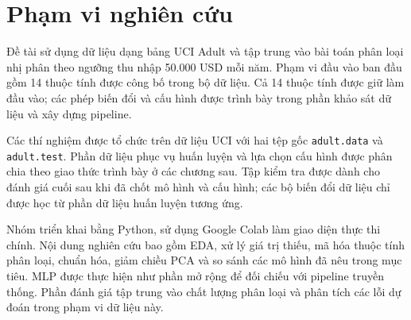 \section{Phạm vi nghiên cứu}
\label{sec:1_3}
Đề tài sử dụng dữ liệu dạng bảng UCI Adult và tập trung vào bài toán phân loại nhị phân theo ngưỡng thu nhập 50.000 USD mỗi năm. Phạm vi đầu vào ban đầu gồm 14 thuộc tính được công bố trong bộ dữ liệu. Cả 14 thuộc tính được giữ làm đầu vào; các phép biến đổi và cấu hình được trình bày trong phần khảo sát dữ liệu và xây dựng pipeline.

Các thí nghiệm được tổ chức trên dữ liệu UCI với hai tệp gốc \texttt{adult.data} và \texttt{adult.test}. Phần dữ liệu phục vụ huấn luyện và lựa chọn cấu hình được phân chia theo giao thức trình bày ở các chương sau. Tập kiểm tra được dành cho đánh giá cuối sau khi đã chốt mô hình và cấu hình; các bộ biến đổi dữ liệu chỉ được học từ phần dữ liệu huấn luyện tương ứng.

Nhóm triển khai bằng Python, sử dụng Google Colab làm giao diện thực thi chính. Nội dung nghiên cứu bao gồm EDA, xử lý giá trị thiếu, mã hóa thuộc tính phân loại, chuẩn hóa, giảm chiều PCA và so sánh các mô hình đã nêu trong mục tiêu. MLP được thực hiện như phần mở rộng để đối chiếu với pipeline truyền thống. Phần đánh giá tập trung vào chất lượng phân loại và phân tích các lỗi dự đoán trong phạm vi dữ liệu này.
